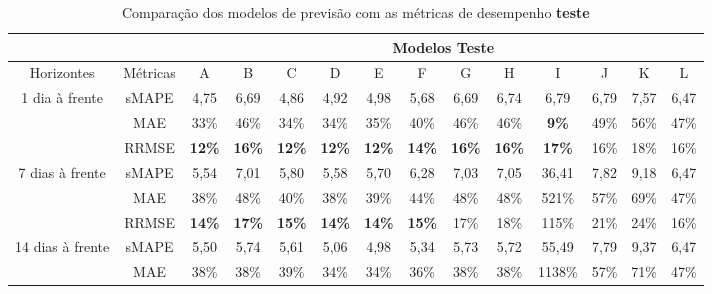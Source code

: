 \begin{landscape}
\begin{table}[H]
	\centering
	\caption{Comparação dos modelos de previsão com as métricas de desempenho \textbf{teste}}\label{tb:apd-tst}
	\begin{tabular}{@{}cccccccccccccc@{}}
		\toprule
		&          & \multicolumn{12}{c}{Modelos Teste}                                                                                                                                 \\ \midrule
		Horizontes                        & Métricas & A             & B             & C             & D             & E             & F             & G             & H             & I             & J    & K    & L    \\ \midrule
		\multirow{3}{*}{1 dia à frente}   & sMAPE    & 4,75          & 6,69          & 4,86          & 4,92          & 4,98          & 5,68          & 6,69          & 6,74          & 6,79          & 6,79 & 7,57 & 6,47 \\
		& MAE      & 33\%          & 46\%          & 34\%          & 34\%          & 35\%          & 40\%          & 46\%          & 46\%          & \textbf{9\%}  & 49\% & 56\% & 47\% \\
		& RRMSE    & \textbf{12\%} & \textbf{16\%} & \textbf{12\%} & \textbf{12\%} & \textbf{12\%} & \textbf{14\%} & \textbf{16\%} & \textbf{16\%} & \textbf{17\%} & 16\% & 18\% & 16\% \\ \midrule
		\multirow{3}{*}{7 dias à frente}  & sMAPE    & 5,54          & 7,01          & 5,80          & 5,58          & 5,70          & 6,28          & 7,03          & 7,05          & 36,41         & 7,82 & 9,18 & 6,47 \\
		& MAE      & 38\%          & 48\%          & 40\%          & 38\%          & 39\%          & 44\%          & 48\%          & 48\%          & 521\%         & 57\% & 69\% & 47\% \\
		& RRMSE    & \textbf{14\%} & \textbf{17\%} & \textbf{15\%} & \textbf{14\%} & \textbf{14\%} & \textbf{15\%} & 17\%          & 18\%          & 115\%         & 21\% & 24\% & 16\% \\ \midrule
		\multirow{3}{*}{14 dias à frente} & sMAPE    & 5,50          & 5,74          & 5,61          & 5,06          & 4,98          & 5,34          & 5,73          & 5,72          & 55,49         & 7,79 & 9,37 & 6,47 \\
		& MAE      & 38\%          & 38\%          & 39\%          & 34\%          & 34\%          & 36\%          & 38\%          & 38\%          & 1138\%        & 57\% & 71\% & 47\% \\

\end{tabular}
\end{table}
\end{landscape}

